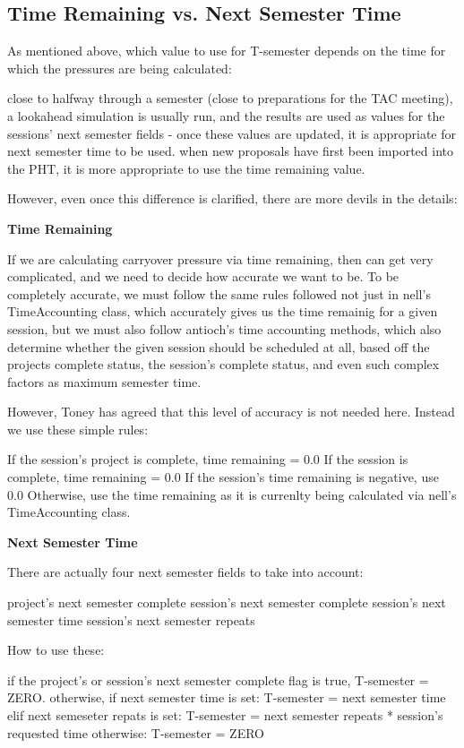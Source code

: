 \documentclass{article}
\begin{document}
\subsection{Time Remaining vs. Next Semester Time}

As mentioned above, which value to use for T-semester depends on the time for which the pressures are being calculated:

    close to halfway through a semester (close to preparations for the TAC meeting), a lookahead simulation is usually run, and the results are used as values for the sessions' next semester fields - once these values are updated, it is appropriate for next semester time to be used.
    when new proposals have first been imported into the PHT, it is more appropriate to use the time remaining value. 

However, even once this difference is clarified, there are more devils in the details: 

{\bf Time Remaining}

If we are calculating carryover pressure via time remaining, then can get very complicated, and we need to decide how accurate we want to be. To be completely accurate, we must follow the same rules followed not just in nell's TimeAccounting class, which accurately gives us the time remainig for a given session, but we must also follow antioch's time accounting methods, which also determine whether the given session should be scheduled at all, based off the projects complete status, the session's complete status, and even such complex factors as maximum semester time.

However, Toney has agreed that this level of accuracy is not needed here. Instead we use these simple rules:

    If the session's project is complete, time remaining = 0.0
    If the session is complete, time remaining = 0.0
    If the session's time remaining is negative, use 0.0
    Otherwise, use the time remaining as it is currenlty being calculated via nell's TimeAccounting class. 

{\bf Next Semester Time}

There are actually four next semester fields to take into account:

    project's next semester complete
    session's next semester complete
    session's next semester time
    session's next semester repeats 

How to use these:

    if the project's or session's next semester complete flag is true, T-semester = ZERO.
    otherwise, if next semester time is set:
        T-semester = next semester time 
    elif next semeseter repats is set:
        T-semester = next semester repeats * session's requested time 
    otherwise:
        T-semester = ZERO 
\end{document}
